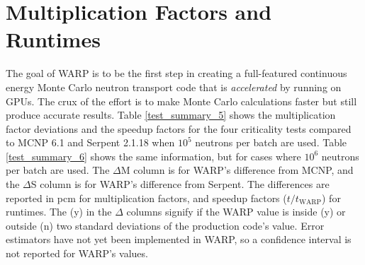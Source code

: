 \section{Multiplication Factors and Runtimes}

The goal of WARP is to be the first step in creating a full-featured continuous energy Monte Carlo neutron transport code that is \emph{accelerated} by running on GPUs.  The crux of the effort is to make Monte Carlo calculations faster but still produce accurate results.  Table \ref{test_summary_5} shows the multiplication factor deviations and the speedup factors for the four criticality tests compared to MCNP 6.1 and Serpent 2.1.18 when $10^5$ neutrons per batch are used.  Table  \ref{test_summary_6} shows the same information, but for cases where $10^6$ neutrons per batch are used.  The $\Delta$M column is for WARP's difference from MCNP, and the $\Delta$S column is for WARP's difference from Serpent.  The differences are reported in pcm for multiplication factors, and speedup factors ($t/t_\mathrm{WARP}$) for runtimes.  The (y) in the $\Delta$ columns signify if the WARP value is inside (y) or outside (n) two standard deviations of the production code's value. Error estimators have not yet been implemented in WARP, so a confidence interval is not reported for WARP's values.

